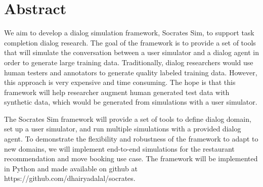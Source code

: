 \chapter*{Abstract}
\thispagestyle{empty}	%

We aim to develop a dialog simulation framework, Socrates Sim, to support task completion dialog research. The goal of the framework is to provide a set of tools that will simulate the conversation between a user simulator and a dialog agent in order to generate large training data. Traditionally, dialog researchers would use human testers and annotators to generate quality labeled training data. However, this approach is very expensive and time consuming. The hope is that this framework will help researcher augment human generated test data with synthetic data, which would be generated from simulations with a user simulator. 

The Socrates Sim framework will provide a set of tools to define dialog domain, set up a user simulator, and run multiple simulations with a provided dialog agent. To demonstrate the flexibility and robustness of the framework to adapt to new domains, we will implement end-to-end simulations for the restaurant recommendation and move booking use case. The framework will be implemented in Python and made available on github at https://github.com/dhairyadalal/socrates. 

